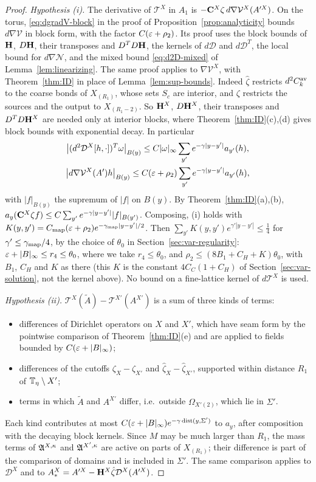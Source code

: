 \begin{proof}
\emph{Hypothesis (i).} The derivative of $\mathcal T^X$ in $A_1$ is $-\mathbf C^X\zeta\,d\nabla\mathcal V^X(A'^X)$. On the torus, \eqref{eq:dgradV-block} in the proof of Proposition~\ref{prop:analyticity} bounds $d\nabla\mathcal V$ in block form, with the factor $C(\varepsilon+\rho_2)$. Its proof uses the block bounds of $\mathbf H$, $D\mathbf H$, their transposes and $D^TD\mathbf H$, the kernels of $d\mathcal D$ and $d\mathcal D^T$, the local bound for $d\nabla\mathcal N$, and the mixed bound \eqref{eq:d2D-mixed} of Lemma~\ref{lem:linearizing}. The same proof applies to $\nabla\mathcal V^X$, with Theorem~\ref{thm:ID} in place of Lemma~\ref{lem:sup-bounds}. Indeed $\hat\zeta$ restricts $d^2C^{\rm av}_k$ to the coarse bonds of $X_{(R_1)}$, whose sets $S_c$ are interior, and $\zeta$ restricts the sources and the output to $X_{(R_1-2)}$. So $\mathbf H^X$, $D\mathbf H^X$, their transposes and $D^TD\mathbf H^X$ are needed only at interior blocks, where Theorem~\ref{thm:ID}(c),(d) gives block bounds with exponential decay. In particular
\begin{gather*}
\big|(d^2\mathcal D^X[h,\cdot])^T\omega\big|_{B(y)}\le C|\omega|_\infty\sum_{y'}e^{-\gamma|y-y'|}a_{y'}(h),\\
\big|d\nabla\mathcal V^X(A')h\big|_{B(y)}\le C(\varepsilon+\rho_2)\sum_{y'}e^{-\gamma|y-y'|}a_{y'}(h),
\end{gather*}
with $|f|_{B(y)}$ the supremum of $|f|$ on $B(y)$. By Theorem~\ref{thm:ID}(a),(b), $a_y(\mathbf C^X\zeta f)\le C\sum_{y'}e^{-\gamma|y-y'|}|f|_{B(y')}$. Composing, (i) holds with $K(y,y')=C_{\rm map}(\varepsilon+\rho_2)e^{-\gamma_{\rm map}|y-y'|/2}$. Then $\sum_{y'}K(y,y')e^{\gamma'|y-y'|}\le\frac14$ for $\gamma'\le\gamma_{\rm map}/4$, by the choice of $\theta_0$ in Section~\ref{sec:var-regularity}: $\varepsilon+|B|_\infty\le r_4\le\theta_0$, where we take $r_4\le\theta_0$, and $\rho_2\le(8B_1+C_H+K)\theta_0$, with $B_1$, $C_H$ and $K$ as there (this $K$ is the constant $4C_C(1+C_H)$ of Section~\ref{sec:var-solution}, not the kernel above). No bound on a fine-lattice kernel of $d\mathcal T^X$ is used.

\emph{Hypothesis (ii).} $\mathcal T^X(\tilde A)-\mathcal T^{X'}(A^{X'})$ is a sum of three kinds of terms:
\begin{itemize}
\item differences of Dirichlet operators on $X$ and $X'$, which have seam form by the pointwise comparison of Theorem~\ref{thm:ID}(e) and are applied to fields bounded by $C(\varepsilon+|B|_\infty)$;
\item differences of the cutoffs $\zeta_X-\zeta_{X'}$ and $\hat\zeta_X-\hat\zeta_{X'}$, supported within distance $R_1$ of $\mathbb T_\eta\setminus X'$;
\item terms in which $\tilde A$ and $A^{X'}$ differ, i.e.\ outside $\Omega_{X'(2)}$, which lie in $\Sigma'$.
\end{itemize}
Each kind contributes at most $C(\varepsilon+|B|_\infty)e^{-\gamma\operatorname{dist}(y,\Sigma')}$ to $a_y$, after composition with the decaying block kernels. Since $M$ may be much larger than $R_1$, the mass terms of $\mathfrak A^{X,\kappa}$ and $\mathfrak A^{X',\kappa}$ are active on parts of $X_{(R_1)}$; their difference is part of the comparison of domains and is included in $\Sigma'$. The same comparison applies to $\mathcal D^X$ and to $A^X_*=A'^X-\mathbf H^X\hat\zeta\mathcal D^X(A'^X)$.


\end{proof}
